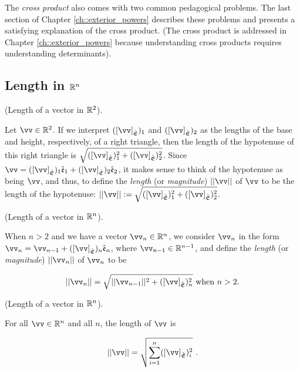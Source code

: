 \vspace{.5cm}

The \textit{cross product} also comes with two common pedagogical problems. The last section of Chapter \ref{ch::exterior_powers} describes these problems and presents a satisfying explanation of the cross product. (The cross product is addressed in Chapter \ref{ch::exterior_powers} because understanding cross products requires understanding determinants).

\newpage

\subsection*{Length in $\mathbb{R}^n$}
\label{ch::lin_alg::subsection::mag_and_angle_Rn}

\begin{defn}
\label{ch::lin_alg::defn::length_in_R2}
    (Length of a vector in $\mathbb{R}^2$).

    Let $\vv \in \R^2$. If we interpret $([\vv]_\sE)_1$ and $([\vv]_\sE)_2$ as the lengths of the base and height, respectively, of a right triangle, then the length of the hypotenuse of this right triangle is $\sqrt{([\vv]_\sE)_1^2 + ([\vv]_\sE)_2^2}$. Since $\vv = ([\vv]_\sE)_1 \see_1 + ([\vv]_\sE)_2 \see_2$, it makes sense to think of the hypotenuse as being $\vv$, and thus, to define the \textit{length} (or \textit{magnitude}) $||\vv||$ of $\vv$ to be the length of the hypotenuse: $||\vv|| := \sqrt{([\vv]_\sE)_1^2 + ([\vv]_\sE)_2^2}$.
\end{defn}

\begin{defn}
\label{ch::lin_alg::defn::length_in_Rn}
    (Length of a vector in $\mathbb{R}^n$). 

    When $n > 2$ and we have a vector $\vv_n \in \R^n$, we consider $\vv_n$ in the form $\vv_n = \vv_{n - 1} + ([\vv]_\sE)_n \see_n$, where $\vv_{n - 1} \in \R^{n - 1}$, and define the \textit{length} (or \textit{magnitude}) $||\vv_n||$ of $\vv_n$ to be

    \begin{align*}
        ||\vv_n|| = \sqrt{||\vv_{n - 1}||^2 + ([\vv]_\sE)_n^2} \text{ when $n > 2$}.
    \end{align*}
\end{defn}

\begin{theorem}
    (Length of a vector in $\mathbb{R}^n$).

    For all $\vv \in \R^n$ and all $n$, the length of $\vv$ is

    \begin{align*}
        ||\vv|| = \sqrt{\sum_{i = 1}^n ([\vv]_\sE)_i^2}\spc.
    \end{align*}
\end{theorem}

